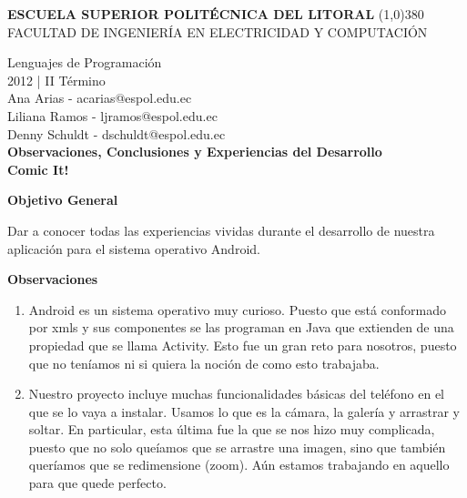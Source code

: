 \documentclass[12pt]{report}
\begin{document}
	\setlength{\topmargin}{-0.5in}
	\pagestyle{empty}
	\begin{center}
		\textbf{
			\vspace{-0.7em}
			ESCUELA SUPERIOR POLITÉCNICA DEL LITORAL
		}
		\line(1,0){380}\\		
		\scriptsize{FACULTAD DE INGENIERÍA EN ELECTRICIDAD Y COMPUTACIÓN}
	\end{center}
	\begin{center}
		\vspace{2.5em}
		Lenguajes de Programación
		\\2012 | II Término
		\vspace{1.5em}
		\\Ana Arias - acarias@espol.edu.ec
		\vspace{0.6mm}
		\\Liliana Ramos - ljramos@espol.edu.ec
		\\Denny Schuldt - dschuldt@espol.edu.ec
		\vspace{3em}
		\large{\textbf{\\ Observaciones, Conclusiones y Experiencias del Desarrollo	\vspace{2em}}}		
	\Huge{\textbf{\\ Comic It!	\vspace{1em}}}
\end{center}
		
\begingroup
		\large{
			\textbf{
				Objetivo General
				\newline
				\newline
			}
		}
	\endgroup

	Dar a conocer todas las experiencias vividas durante el desarrollo de nuestra aplicación para el sistema operativo Android.

	\vspace{4em}

\begingroup
		\large{
			\textbf{
				Observaciones
				\newline
				\newline
			}
		}
	\endgroup

		\begin{enumerate}[a]%
		\item Android es un sistema operativo muy curioso. Puesto que está conformado por xmls y sus componentes se las programan en Java que extienden de una propiedad que se llama Activity.
Esto fue un gran reto para nosotros, puesto que no teníamos ni si quiera la noción de como esto trabajaba.
		\item Nuestro proyecto incluye muchas funcionalidades básicas del teléfono en el que se lo vaya a instalar. Usamos lo que es la cámara, la galería y arrastrar y soltar. En particular, esta última fue la que se nos hizo muy complicada, puesto que no solo queíamos que se arrastre una imagen, sino que también queríamos que se redimensione (zoom). Aún estamos trabajando en aquello para que quede perfecto.
		\end{enumerate}
	
\end{document}
